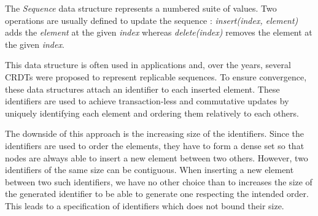 \documentclass{article}
\begin{document}

The \emph{Sequence} data structure represents a numbered suite of values.
Two operations are usually defined to update the sequence :
\emph{insert(index, element)} adds the \emph{element} at the given \emph{index}
whereas \emph{delete(index)} removes the element at the given \emph{index}.

This data structure is often used in applications and, over the years, several \acp{CRDT} were proposed to represent replicable sequences.
To ensure convergence, these data structures attach an identifier to each inserted element.
These identifiers are used to achieve transaction-less and commutative updates by uniquely identifying each element and ordering them relatively to each others.

The downside of this approach is the increasing size of the identifiers.
Since the identifiers are used to order the elements, they have to form a dense set so that nodes are always able to insert a new element between two others.
However, two identifiers of the same size can be contiguous.
When inserting a new element between two such identifiers, we have no other choice than to increases the size of the generated identifier to be able to generate one respecting the intended order. This leads to a specification of identifiers which does not bound their size.
\end{document}
